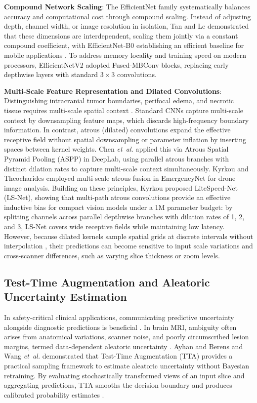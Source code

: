 \documentclass[journal]{IEEEtran}
\begin{document}
\noindent\textbf{Compound Network Scaling}: The EfficientNet family \cite{30} systematically balances accuracy and computational cost through compound scaling. Instead of adjusting depth, channel width, or image resolution in isolation, Tan and Le demonstrated that these dimensions are interdependent, scaling them jointly via a constant compound coefficient, with EfficientNet-B0 establishing an efficient baseline for mobile applications \cite{30}. To address memory locality and training speed on modern processors, EfficientNetV2 \cite{31} adopted Fused-MBConv blocks, replacing early depthwise layers with standard $3\times3$ convolutions.

\noindent\textbf{Multi-Scale Feature Representation and Dilated Convolutions}: Distinguishing intracranial tumor boundaries, perifocal edema, and necrotic tissue requires multi-scale spatial context \cite{2, 23, 39}. Standard CNNs capture multi-scale context by downsampling feature maps, which discards high-frequency boundary information. In contrast, atrous (dilated) convolutions \cite{5} expand the effective receptive field without spatial downsampling or parameter inflation by inserting spaces between kernel weights. Chen \emph{et~al.} \cite{5} applied this via Atrous Spatial Pyramid Pooling (ASPP) in DeepLab, using parallel atrous branches with distinct dilation rates to capture multi-scale context simultaneously. Kyrkou and Theocharides \cite{17} employed multi-scale atrous fusion in EmergencyNet for drone image analysis. Building on these principles, Kyrkou \cite{16} proposed LiteSpeed-Net (LS-Net), showing that multi-path atrous convolutions provide an effective inductive bias for compact vision models under a 1M parameter budget: by splitting channels across parallel depthwise branches with dilation rates of 1, 2, and 3, LS-Net covers wide receptive fields while maintaining low latency. However, because dilated kernels sample spatial grids at discrete intervals without interpolation \cite{5, 16}, their predictions can become sensitive to input scale variations and cross-scanner differences, such as varying slice thickness or zoom levels.

\subsection{Test-Time Augmentation and Aleatoric Uncertainty Estimation}
In safety-critical clinical applications, communicating predictive uncertainty alongside diagnostic predictions is beneficial \cite{7, 41}. In brain MRI, ambiguity often arises from anatomical variations, scanner noise, and poorly circumscribed lesion margins, termed data-dependent aleatoric uncertainty \cite{4, 35}. Ayhan and Berens \cite{4} and Wang \emph{et~al.} \cite{35} demonstrated that Test-Time Augmentation (TTA) provides a practical sampling framework to estimate aleatoric uncertainty without Bayesian retraining. By evaluating stochastically transformed views of an input slice and aggregating predictions, TTA smooths the decision boundary and produces calibrated probability estimates \cite{4, 35, 42}.
\end{document}
